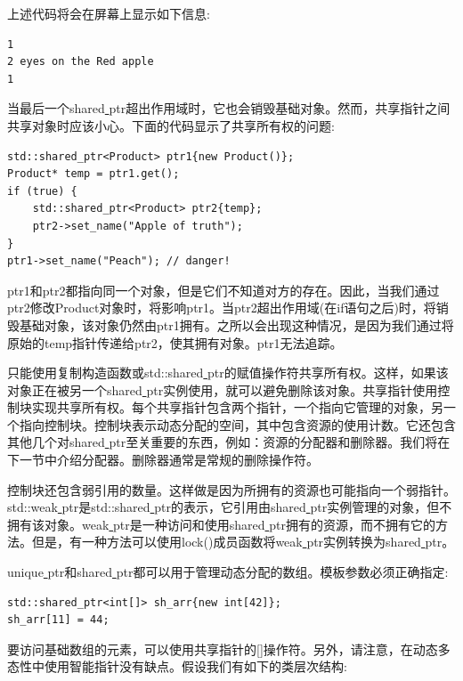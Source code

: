 上述代码将会在屏幕上显示如下信息: \par

\begin{lstlisting}[caption={}]
1
2 eyes on the Red apple
1
\end{lstlisting}

当最后一个shared\underline{ }ptr超出作用域时，它也会销毁基础对象。然而，共享指针之间共享对象时应该小心。下面的代码显示了共享所有权的问题: \par

\begin{lstlisting}[caption={}]
std::shared_ptr<Product> ptr1{new Product()};
Product* temp = ptr1.get();
if (true) {
	std::shared_ptr<Product> ptr2{temp};
	ptr2->set_name("Apple of truth");
}
ptr1->set_name("Peach"); // danger!
\end{lstlisting}

ptr1和ptr2都指向同一个对象，但是它们不知道对方的存在。因此，当我们通过ptr2修改Product对象时，将影响ptr1。当ptr2超出作用域(在if语句之后)时，将销毁基础对象，该对象仍然由ptr1拥有。之所以会出现这种情况，是因为我们通过将原始的temp指针传递给ptr2，使其拥有对象。ptr1无法追踪。 \par
只能使用复制构造函数或std::shared\underline{ }ptr的赋值操作符共享所有权。这样，如果该对象正在被另一个shared\underline{ }ptr实例使用，就可以避免删除该对象。共享指针使用控制块实现共享所有权。每个共享指针包含两个指针，一个指向它管理的对象，另一个指向控制块。控制块表示动态分配的空间，其中包含资源的使用计数。它还包含其他几个对shared\underline{ }ptr至关重要的东西，例如：资源的分配器和删除器。我们将在下一节中介绍分配器。删除器通常是常规的删除操作符。 \par
控制块还包含弱引用的数量。这样做是因为所拥有的资源也可能指向一个弱指针。std::weak\underline{ }ptr是std::shared\underline{ }ptr的表示，它引用由shared\underline{ }ptr实例管理的对象，但不拥有该对象。weak\underline{ }ptr是一种访问和使用shared\underline{ }ptr拥有的资源，而不拥有它的方法。但是，有一种方法可以使用lock()成员函数将weak\underline{ }ptr实例转换为shared\underline{ }ptr。\par
unique\underline{ }ptr和shared\underline{ }ptr都可以用于管理动态分配的数组。模板参数必须正确指定: \par

\begin{lstlisting}[caption={}]
std::shared_ptr<int[]> sh_arr{new int[42]};
sh_arr[11] = 44;
\end{lstlisting}

要访问基础数组的元素，可以使用共享指针的[]操作符。另外，请注意，在动态多态性中使用智能指针没有缺点。假设我们有如下的类层次结构: \par

